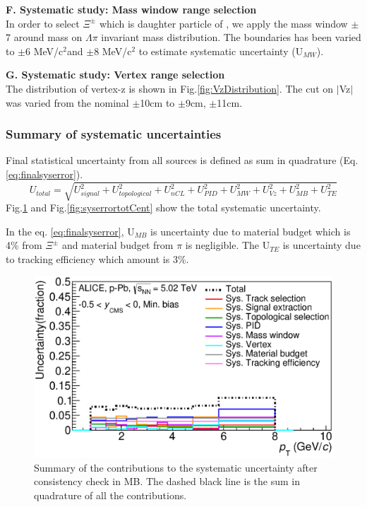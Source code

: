 \textbf{F. Systematic study: Mass window range selection}\\
In order to select $\Xi^{\pm}$ which is daughter particle of \xis, we apply the mass window $\pm$7 \mmass around \xis mass on $\Lambda$$\pi$ invariant mass distribution. The boundaries has been varied to $\pm$6 MeV/c$^{2}$and $\pm$8 MeV/c$^{2}$ to estimate systematic uncertainty (U$_{MW}$). 

\textbf{G. Systematic study: Vertex range selection}\\
The distribution of vertex-z is shown in Fig.\ref{fig:VzDistribution}.
The cut on $|$Vz$|$ was varied from the nominal $\pm$10cm to $\pm$9cm, $\pm$11cm.

\subsubsection{Summary of systematic uncertainties}\label{sec:pPb:sumsys} 
Final statistical uncertainty from all sources is defined as sum in quadrature (Eq. \ref{eq:finalsyserror}).
\begin{equation}
U_{total} = \sqrt{U_{signal}^{2} + U_{topological}^{2} + U_{nCL}^{2} + U_{PID}^{2} + U_{MW}^{2} + U_{Vz}^{2} + U_{MB}^{2} + U_{TE}^{2}}
\label{eq:finalsyserror}
\end{equation}
Fig.\ref{fig:syserrortot} and Fig.\ref{fig:syserrortotCent} show the total systematic uncertainty.

In the eq. \ref{eq:finalsyserror}, U$_{MB}$ is uncertainty due to material budget which is 4\% from $\Xi^{\pm}$ and material budget from $\pi$ is negligible. The U$_{TE}$ is uncertainty due to tracking efficiency which amount is 3\%.  


\begin{figure}[htbp]
\begin{center}
\includegraphics[width=12.0cm]{./Version1/FigChapter5/Systematic/SysTotalFinal.eps}
\caption{Summary of the contributions to the systematic uncertainty after consistency check in MB. The dashed black line is the sum in quadrature of all the contributions.} 
\label{fig:syserrortot}
\end{center}
\end{figure}


